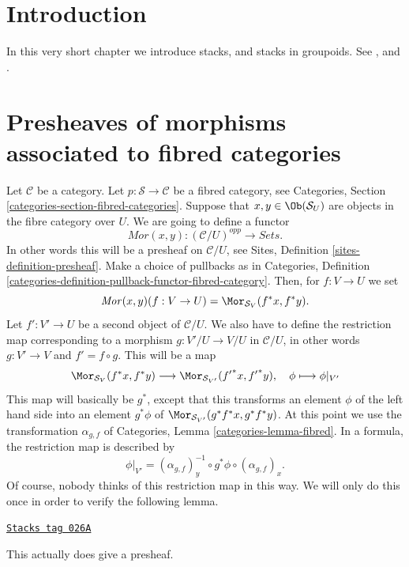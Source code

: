 \section{Introduction}
\label{stacks-section-introduction}
In this very short chapter we introduce stacks, and
stacks in groupoids. See \cite{DM}, and \cite{Vis2}.

\section{Presheaves of morphisms associated to fibred categories}
\label{stacks-section-morphisms}
Let $\mathcal{C}$ be a category.
Let $p : \mathcal{S} \to \mathcal{C}$ be a fibred category,
see Categories, Section \ref{categories-section-fibred-categories}.
Suppose that $x, y\in \Ob(\mathcal{S}_U)$ are
objects in the fibre category over $U$. We are going to define
a functor
$$
\mathit{Mor}(x, y) : (\mathcal{C}/U)^{opp} \longrightarrow \textit{Sets}.
$$
In other words this will be a presheaf on $\mathcal{C}/U$, see
Sites, Definition \ref{sites-definition-presheaf}.
Make a choice of pullbacks as in
Categories,
Definition \ref{categories-definition-pullback-functor-fibred-category}.
Then, for $f : V \to U$ we set
$$
\mathit{Mor}(x, y)(f : V \to U) =
\Mor_{\mathcal{S}_V}(f^\ast x, f^\ast y).
$$
Let $f' : V' \to U$ be a second object of $\mathcal{C}/U$.
We also have to define the restriction map corresponding to a
morphism $g : V'/U  \to V/U$ in $\mathcal{C}/U$,
in other words $g : V' \to V$ and $f' = f \circ g$.
This will be a map
$$
\Mor_{\mathcal{S}_V}(f^\ast x, f^\ast y)
\longrightarrow
\Mor_{\mathcal{S}_{V'}}({f'}^\ast x, {f'}^\ast y), \quad
\phi \longmapsto \phi|_{V'}
$$
This map will basically be $g^\ast$, except that this transforms
an element $\phi$ of the left hand side into an element
$g^\ast \phi$
of $\Mor_{\mathcal{S}_{V'}}(g^\ast f^\ast x, g^\ast f^\ast y)$.
At this point we use the transformation $\alpha_{g, f}$ of
Categories, Lemma \ref{categories-lemma-fibred}.
In a formula, the restriction map is described by
$$
\phi|_{V'} =
(\alpha_{g, f})_y^{-1} \circ
g^\ast \phi \circ
(\alpha_{g, f})_x.
$$
Of course, nobody thinks of this restriction map in this way.
We will only do this once in order to verify the following
lemma.

\begin{lemma}[Painful]
\label{stacks-lemma-painful}
\href{https://stacks.math.columbia.edu/tag/026A}{\texttt{Stacks tag 026A}}

This actually does give a presheaf.
\end{lemma}

